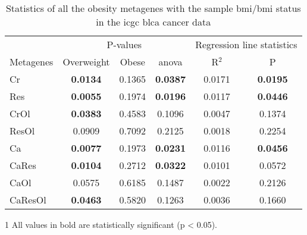 \begin{table}[htpb]
	\centering
	\caption{Statistics of all the obesity metagenes with the sample \gls{bmi}/\gls{bmi} status in the \gls{icgc} \gls{blca} cancer data}
	\label{tab:degmetablca}
	\begin{threeparttable}
		\begin{tabular}{lccccc}
			& \multicolumn{3}{c}{ P-values} & \multicolumn{2}{c}{ Regression line statistics}\\
			\cmidrule(r){2-4} \cmidrule(r){5-6}
			 Metagenes &  Overweight &  Obese &  \gls{anova} &  R$^2$ &  P \\
			\hline
			\hline
			\rule{0pt}{2.25ex}Cr & {\bfseries 0.0134}\tnote{1} & 0.1365 & {\bfseries 0.0387} & 0.0171 & {\bfseries 0.0195} \\
			Res                  & {\bfseries 0.0055}          & 0.1974 & {\bfseries 0.0196} & 0.0117 & {\bfseries 0.0446} \\
			CrOl                 & {\bfseries 0.0383}          & 0.4583 & 0.1096             & 0.0047 & 0.1374             \\
			ResOl                & 0.0909                      & 0.7092 & 0.2125             & 0.0018 & 0.2254             \\
			Ca                   & {\bfseries 0.0077}          & 0.1973 & {\bfseries 0.0231} & 0.0116 & {\bfseries 0.0456} \\
			CaRes                & {\bfseries 0.0104}          & 0.2712 & {\bfseries 0.0322} & 0.0101 & 0.0572             \\
			CaOl                 & 0.0575                      & 0.6185 & 0.1487             & 0.0022 & 0.2126             \\
			CaResOl              & {\bfseries 0.0463}          & 0.5820 & 0.1263             & 0.0036 & 0.1660             \\
			\hline
			\hline
		\end{tabular}
		\begin{tablenotes}
			\item [1] All values in bold are statistically significant (p \textless{} 0.05).
		\end{tablenotes}
	\end{threeparttable}
\end{table}

